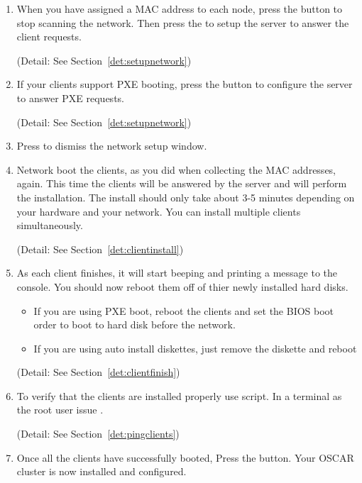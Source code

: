\begin {enumerate}
  (Detail: See Section~\ref{det:setupnetwork})

\item When you have assigned a MAC address to each node, press the
   button to stop scanning the network. Then
  press the  to setup the server to
  answer the client requests.

  (Detail: See Section~\ref{det:setupnetwork})

\item If your clients support PXE booting, press the  button to configure the server to answer PXE
  requests.

  (Detail: See Section~\ref{det:setupnetwork})

\item Press  to dismiss the network setup window.
  
\item Network boot the clients, as you did when collecting the MAC
  addresses, again. This time the clients will be answered by the
  server and will perform the installation. The install should only
  take about 3-5 minutes depending on your hardware and your network.
  You can install multiple clients simultaneously.

  (Detail: See Section~\ref{det:clientinstall})

\item As each client finishes, it will start beeping and printing a
  message to the console. You should now reboot them off of thier
  newly installed hard disks.

  \begin{itemize}
  \item If you are using PXE boot, reboot the clients and set the BIOS
    boot order to boot to hard disk before the network.
  \item If you are using auto install diskettes, just remove the
    diskette and reboot
  \end{itemize}

  (Detail: See Section~\ref{det:clientfinish})
  
\item To verify that the clients are installed properly use
   script.  In a terminal as the root user issue
  .

  (Detail: See Section~\ref{det:pingclients})
  
\item Once all the clients have successfully booted, Press the
   button. Your OSCAR cluster is now
  installed and configured.


\end{enumerate}
